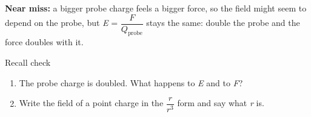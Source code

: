 \documentclass[11pt]{article}
\begin{document}
\begin{keepsection}
\begin{notebox}\textbf{Near miss:} a bigger probe charge feels a bigger force, so the field might seem to depend on the probe, but \textit{E} = {\small\ensuremath{\dfrac{{F}}{{Q}_{\text{probe}}}}} stays the same: double the probe and the force doubles with it.\end{notebox}

\begin{recallbox}{Recall check}
\begin{enumerate}
\item The probe charge is doubled. What happens to \textit{E} and to \textit{F}?
\item Write the field of a point charge in the {\small\ensuremath{\dfrac{{r}}{{r}^{3}}}} form and say what \textit{r} is.
\end{enumerate}

\end{recallbox}
\end{keepsection}
\end{document}
